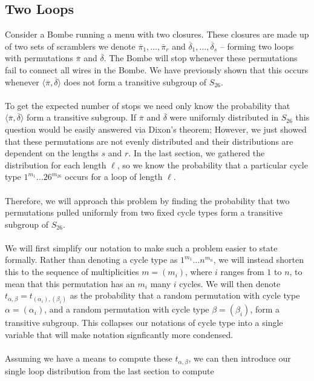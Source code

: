 \subsection{Two Loops}
Consider a Bombe running a menu with two closures. These closures are made up of two sets of scramblers we denote $\overline\pi_1, \dots, \overline\pi_r$ and $\overline\delta_1,\dots,\overline\delta_s$ -- forming two loops with permutations $\overline\pi$ and $\overline\delta$. The Bombe will stop whenever these permutations fail to connect all wires in the Bombe. We have previously shown that this occurs whenever $\langle \overline\pi, \overline\delta \rangle$ does not form a transitive subgroup of $S_{26}$.
\\\\To get the expected number of stops we need only know the probability that $\langle \overline\pi, \overline\delta \rangle$ form a transitive subgroup. If $\overline\pi$ and $\overline\delta$ were uniformly distributed in $S_{26}$ this question would be easily answered via Dixon's theorem; However, we just showed that these permutations are not evenly distributed and their distributions are dependent on the lengths $s$ and $r$. In the last section, we gathered the distribution for each length $\ell$, so we know the probability that a particular cycle type $1^{m_1}\dots26^{m_{26}}$ occurs for a loop of length $\ell$.
\\\\Therefore, we will approach this problem by finding the probability that two permutations pulled uniformly from two fixed cycle types form a transitive subgroup of $S_{26}$.
\\\\We will first simplify our notation to make such a problem easier to state formally. Rather than denoting a cycle type as $1^{m_1}\dots n^{m_{n}}$, we will instead shorten this to the sequence of multiplicities $m=(m_i)$, where $i$ ranges from $1$ to $n$, to mean that this permutation has an $m_i$ many $i$ cycles. We will then denote $t_{\alpha, \beta} =t_{(\alpha_i), (\beta_i)}$ as the probability that a random permutation with cycle type $\alpha =(\alpha_i)$, and a random permutation with cycle type $\beta = (\beta_i)$, form a transitive subgroup. This collapses our notations of cycle type into a single variable that will make notation signficantly more condensed. 
\\\\Assuming we have a means to compute these $t_{\alpha, \beta}$, we can then introduce our single loop distribution from the last section to compute
